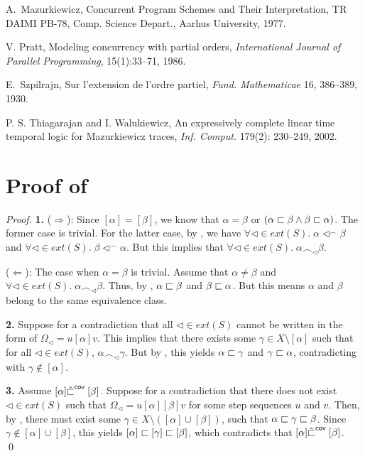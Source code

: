 \documentclass{llncs}
\begin{document}
\begin{thebibliography}{19}
A.~Mazurkiewicz,
\newblock Concurrent Program Schemes and Their Interpretation, TR DAIMI PB-78, Comp. Science Depart., Aarhus University, 1977.





V. Pratt,
\newblock Modeling concurrency with partial orders,
{\em International Journal of Parallel Programming}, 15(1):33--71, 1986.



E.~Szpilrajn, Sur l'extension de l'ordre partiel, {\em Fund. Mathematicae} 16, 386--389, 1930.


 P. S. Thiagarajan and I. Walukiewicz, An expressively complete linear time temporal logic for Mazurkiewicz traces, \emph{Inf. Comput.} 179(2): 230--249, 2002.





\end{thebibliography}

\appendix
\section{Proof of }
\begin{proof}\textbf{1.} ($\Rightarrow$):  Since $[\alpha]=[\beta]$,  we know that $\alpha=\beta$ or $(\alpha\sqsubset \beta\wedge \beta \sqsubset \alpha)$. The former case is trivial. For the latter case, by ,  we have
$\forall \lhd \in ext(S).\; \alpha \lhd^{\frown} \beta$ and $\forall \lhd \in ext(S).\; \beta \lhd^{\frown} \alpha$. 
But this implies that $\forall \lhd \in ext(S).\; \alpha \frown_{\lhd} \beta$.

($\Leftarrow$): The case when $\alpha=\beta$ is trivial. Assume that  $\alpha\not=\beta$ and $\forall \lhd \in ext(S).\; \alpha \frown_{\lhd} \beta$. Thus, by , $\alpha \sqsubset \beta$ and $\beta \sqsubset \alpha$. But this means $\alpha$ and $\beta$ belong to the same equivalence class.

\textbf{2. } Suppose for a contradiction that all $\lhd \in ext(S)$ cannot be written in the form of $\Omega_{\lhd} = u[\alpha]v$. This implies that there exists some $\gamma\in X\setminus [\alpha]$ such that for all $\lhd \in ext(S)$, $\alpha \frown_\lhd \gamma$. But by , this yields $\alpha \sqsubset \gamma$ and $\gamma \sqsubset \alpha$, contradicting with $\gamma\not\in [\alpha]$.

\textbf{3. } Assume $[\alpha] {\hat{\sqsubset}}^{\mathsf{cov}\;} [\beta]$. Suppose for a contradiction that there does not exist $\lhd \in ext(S)$ such that $\Omega_{\lhd} = u[\alpha][\beta]v$ for some step sequences $u$ and $v$. Then, by  ,  there must exist some $\gamma \in X\setminus ([\alpha]\cup[\beta])$, such that $\alpha \sqsubset \gamma \sqsubset \beta$. Since $\gamma \not\in [\alpha]\cup[\beta]$, this yields $[\alpha]\sqsubset [\gamma] \sqsubset [\beta]$, which  contradicts that $[\alpha] {\hat{\sqsubset}}^{\mathsf{cov}\;} [\beta]$.
\qed
\end{proof}
\end{document}
